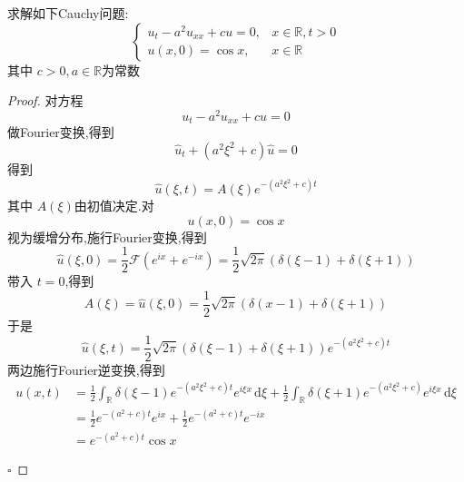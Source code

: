 \documentclass[../../main.tex]{subfiles}
\begin{document}
\begin{problemsec}
    
\end{problemsec}

\begin{problem}
    求解如下Cauchy问题: \[
    \begin{cases} u_{t}-a^{2}u_{x x}+ cu= 0,&x\in \mathbb{R} ,t> 0\\ 
     u\left( x,0 \right)= \cos x,&x\in \mathbb{R}   \end{cases} 
    \]其中 \(  c> 0,a\in \mathbb{R}   \)为常数 
\end{problem}
\begin{proof}
    对方程 \[
    u_{t}-a^{2}u_{xx}+ cu= 0
    \]做Fourier变换,得到 \[
    \hat{u}_{t}+ \left( a^{2} \xi ^{2}+ c \right) \hat{u}= 0
    \]得到\[
    \hat{u}\left(  \xi ,t \right)= A\left(  \xi  \right)e^{-\left( a^{2} \xi ^{2}+ c \right)t }  
    \]其中 \(  A\left(  \xi  \right)   \)由初值决定.对 \[
    u\left( x,0 \right)= \cos x 
    \]视为缓增分布,施行Fourier变换,得到\[
    \hat{u}\left(  \xi ,0 \right) = \frac{1}{2}\mathcal{F}\left( e^{ix}+ e^{-ix} \right)= \frac{1}{2}\sqrt{2\pi }\left(  \delta \left( \xi -1 \right)+  \delta \left( \xi + 1 \right)   \right)  
    \] 带入 \(  t= 0  \),得到 \[
    A\left(  \xi  \right)= \hat{u}\left(  \xi ,0 \right)=   \frac{1}{2}\sqrt{2\pi }\left(  \delta \left( x-1 \right)+  \delta \left(  \xi + 1 \right)   \right) 
    \] 于是 \[
    \hat{u}\left(  \xi ,t \right)= \frac{1}{2}\sqrt{2\pi }\left(  \delta \left( \xi -1 \right)+  \delta \left( \xi + 1 \right)   \right)e^{-\left( a^{2} \xi ^{2}+ c \right)t }  
    \]两边施行Fourier逆变换,得到 \[
    \begin{aligned}
    u\left( x,t \right)&= \frac{1 }{2 } \int_{\mathbb{R} } \delta \left( \xi -1 \right)e^{-\left( a^{2} \xi ^{2}+ c \right)t }e^{i \xi x}\,\mathrm{d}  \xi + \frac{1}{2}\int_{\mathbb{R} } \delta \left( \xi + 1 \right)e^{-\left( a^{2} \xi ^{2}+ c \right) }   e^{i \xi x}\,\mathrm{d}  \xi \\ 
     &= \frac{1}{2}e^{-\left( a^{2}+ c \right)t }e^{i x}+ \frac{1}{2}e^{-\left( a^{2}+ c \right)t }e^{-i  x}\\ 
      &=  e^{-\left( a^{2}+ c \right)t }\cos x 
    \end{aligned}
    \]

    \hfill $\square$
\end{proof}
\end{document}
